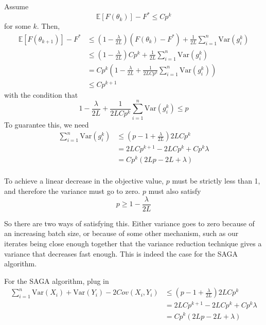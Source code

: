 \documentclass[11pt]{article}
\newcommand{\Var}{\mathrm{Var}}
\begin{document}
Assume 
\begin{equation}
	\mathbb{E} [ F(\theta_{k}) ]  - F^* \leq C p^k 
\end{equation}
for some $k$. Then, 
	\begin{align*}
		\mathbb{E} [ F(\theta_{k+1}) ]  - F^* & \leq ( 1-\frac{\lambda}{2L})   (F(\theta_k) - F^*)+ \frac{1}{2L}\sum_{i=1}^n \Var ( g^k_i) \\
											  & \leq ( 1-\frac{\lambda}{2L})   C p^k+ \frac{1}{2L}\sum_{i=1}^n \Var ( g^k_i)\\
											  & = C p^k ( 1-\frac{\lambda}{2L} + \frac{1}{2LC p^k }\sum_{i=1}^n \Var ( g^k_i)) \\
											  & \leq C p^{k+1}  
	\end{align*}
	with the condition that 
	\begin{equation}
		1-\frac{\lambda}{2L} + \frac{1}{2LC p^k }\sum_{i=1}^n \Var ( g^k_i) \leq p
	\end{equation}
	To guarantee this, we need 
	\begin{align*}
		 \sum_{i=1}^n \Var ( g^k_i) &\leq \left( p -1 +\frac{\lambda}{2L} \right) 2LC p^k  \\
		 &= 2LC p^{k+1} -2LC p^k +C p^k\lambda \\
		 &= C p^k \left( 2L p -2L +\lambda \right)  \\
	\end{align*}

To achieve a linear decrease in the objective value, $p$ must be strictly less than 1, and therefore the variance must go to zero. $p$ must also satisfy
\begin{equation}
	p \geq 1 -\frac{\lambda}{2L} 
\end{equation}
	
	So there are two ways of satisfying this. Either variance goes to zero because of an increasing batch size, or because of some other mechanism, such as our iterates being close enough together that the variance reduction technique gives a variance that decreases fast enough. This is indeed the case for the SAGA algorithm. 

For the SAGA algorithm, plug in 
	\begin{align*}
		 \sum_{i=1}^n \Var(X_i) + \Var(Y_i) -2 Cov(X_i,Y_i) &\leq \left( p -1 +\frac{\lambda}{2L} \right) 2LC p^k  \\
		 &= 2LC p^{k+1} -2LC p^k +C p^k\lambda \\
		 &= C p^k \left( 2L p -2L +\lambda \right)  \\
	\end{align*}
	
\end{document}
